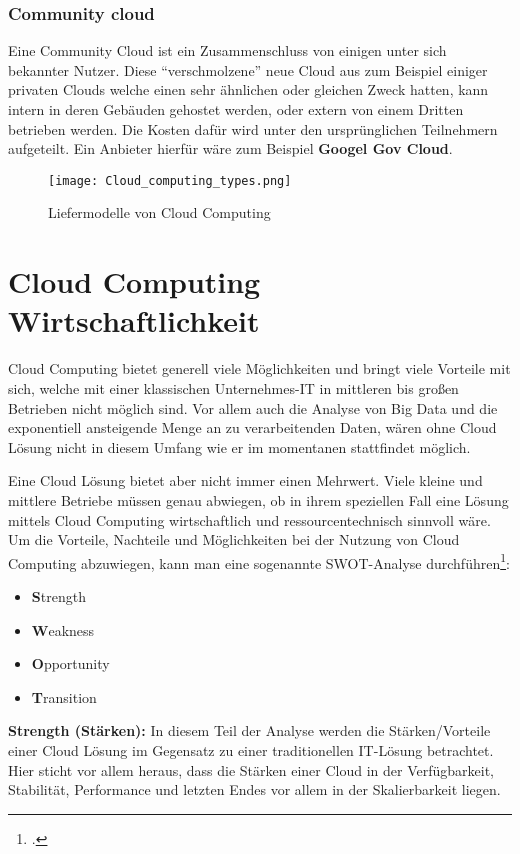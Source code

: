 \subsubsection{Community cloud}
Eine Community Cloud ist ein Zusammenschluss von einigen unter sich bekannter Nutzer. Diese "`verschmolzene"' neue Cloud aus zum Beispiel einiger privaten Clouds welche einen sehr ähnlichen oder gleichen Zweck hatten, kann intern in deren Gebäuden gehostet werden, oder extern von einem Dritten betrieben werden. Die Kosten dafür wird unter den ursprünglichen Teilnehmern aufgeteilt.
Ein Anbieter hierfür wäre zum Beispiel \textbf{Googel Gov Cloud}.
\begin{center}
    \begin{figure}[H]
        \centering
        \texttt{[image: Cloud\_computing\_types.png]}
        \caption{Liefermodelle von Cloud Computing}
    \end{figure}
\end{center}
\section{Cloud Computing Wirtschaftlichkeit}
Cloud Computing bietet generell viele Möglichkeiten und bringt viele Vorteile mit sich, welche mit einer klassischen Unternehmes-IT in mittleren bis großen Betrieben nicht möglich sind. Vor allem auch die Analyse von Big Data und die exponentiell ansteigende Menge an zu verarbeitenden Daten, wären ohne Cloud Lösung nicht in diesem Umfang wie er im momentanen stattfindet möglich.

Eine Cloud Lösung bietet aber nicht immer einen Mehrwert. Viele kleine und mittlere Betriebe müssen genau abwiegen, ob in ihrem speziellen Fall eine Lösung mittels Cloud Computing wirtschaftlich und ressourcentechnisch sinnvoll wäre.
\newpage
Um die Vorteile, Nachteile und Möglichkeiten bei der Nutzung von Cloud Computing abzuwiegen, kann man eine sogenannte SWOT-Analyse
durchführen\footcite{Lehrunterlagen-HTL-cloud}:
\begin{itemize}
	\item \textbf{S}trength
	\item \textbf{W}eakness
	\item \textbf{O}pportunity
	\item \textbf{T}ransition
\end{itemize}

\textbf{Strength (Stärken):} In diesem Teil der Analyse werden die Stärken/Vorteile einer Cloud Lösung im Gegensatz zu einer traditionellen
IT-Lösung betrachtet. Hier sticht vor allem heraus, dass die Stärken einer Cloud in der Verfügbarkeit, Stabilität,
Performance und letzten Endes vor allem in der Skalierbarkeit liegen.

